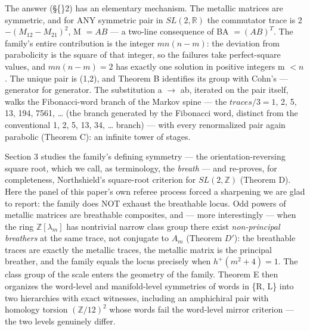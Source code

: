 \documentclass[11pt]{article}
\theoremstyle{plain}
\theoremstyle{definition}
\theoremstyle{remark}
\begin{document}
The answer (\S\{\}2) has an elementary mechanism. The metallic matrices are symmetric, and for ANY symmetric pair in \(SL(2,\mathbb{R})\) the commutator trace is 2 \(- (M_{12} - M_{21})^{2}\), M \(= AB\) — a two-line consequence of BA \(= (AB)^{T}\). The family's entire contribution is the integer \(mn(n-m)\): the deviation from parabolicity is the square of that integer, so the failures take perfect-square values, and \(mn(n-m) = 2\) has exactly one solution in positive integers m \(< n\). The unique pair is (1,2), and Theorem B identifies its group with Cohn's — generator for generator. The substitution a \(\to \) ab, iterated on the pair itself, walks the Fibonacci-word branch of the Markov spine — the \(traces/3 = 1\), 2, 5, 13, 194, 7561, … (the branch generated by the Fibonacci word, distinct from the conventional 1, 2, 5, 13, 34, … branch) — with every renormalized pair again parabolic (Theorem C): an infinite tower of stages.

Section 3 studies the family's defining symmetry — the orientation-reversing square root, which we call, as terminology, the \emph{breath} — and re-proves, for completeness, Northshield's square-root criterion for \(SL(2,\mathbb{Z})\) (Theorem D). Here the panel of this paper's own referee process forced a sharpening we are glad to report: the family does NOT exhaust the breathable locus. Odd powers of metallic matrices are breathable composites, and — more interestingly — when the ring \(\mathbb{Z}[\lambda _{m}]\) has nontrivial narrow class group there exist \emph{non-principal breathers} at the same trace, not conjugate to \(A_{m}\) (Theorem \(D\prime \)): the breathable traces are exactly the metallic traces, the metallic matrix is the principal breather, and the family equals the locus precisely when \(h^{+}(m^{2}+4) = 1\). The class group of the scale enters the geometry of the family. Theorem E then organizes the word-level and manifold-level symmetries of words in \{R, L\} into two hierarchies with exact witnesses, including an amphichiral pair with homology torsion \((\mathbb{Z}/12)^{2}\) whose words fail the word-level mirror criterion — the two levels genuinely differ.
\end{document}

